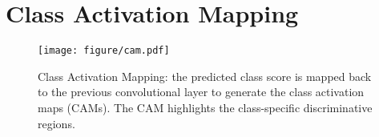 \documentclass[10pt,twocolumn,letterpaper]{article}
\begin{document}

\section{Class Activation Mapping}
\label{sec:cam}

\begin{figure*}
\texttt{[image: figure/cam.pdf]}
 \caption{Class Activation Mapping: the predicted class score is mapped back to the previous convolutional layer to generate the class activation maps (CAMs). The CAM highlights the class-specific discriminative regions.}\label{figure_module}
\end{figure*}
\end{document}
